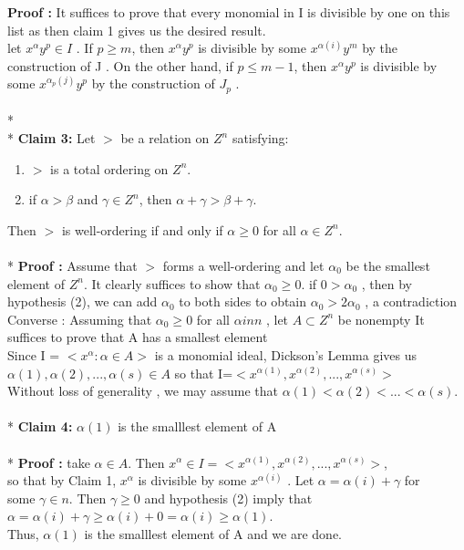 \documentclass[12pt]{article}
\begin{document}
{\bf Proof :}  It suffices to prove that every monomial in I is divisible by one on this list as then claim 1 gives us the desired result.\\
let $x^{\alpha} y^{p} \in I$ . If $p \geq m$, then $x^{\alpha} y^{p}$ is divisible by some $x^{α(i)}y^{m}$ by the construction of J . On the other hand, if $p \leq m - 1$, then $x^{\alpha} y^{p}$ is divisible by some $x^{\alpha_{p}(j)} y^{p}$ by the construction of $J_{p}$ .\\\\*\\*
{\bf Claim 3: } Let $>$ be a relation on $Z^{n}$ satisfying: 
\begin{enumerate}
\item $>$ is a total ordering on $Z^{n}$.
\item if $\alpha > \beta$ and $\gamma \in Z^{n}$, then $\alpha + \gamma > \beta + \gamma$.
\end{enumerate}
Then $>$ is well-ordering if and only if $\alpha \geq 0$ for all $\alpha \in Z^{n}$.\\\\*
{\bf Proof :} Assume that $>$ forms a well-ordering and let $\alpha_{0}$ be the smallest element of $Z^{n}$. It clearly suffices to show that $\alpha_{0} \geq 0$.  if $0 > \alpha_{0}$ , then by hypothesis (2), we can add $\alpha_{0}$ to both sides to obtain $\alpha_{0} > 2\alpha_{0}$ , a contradiction\\ 
Converse : Assuming that $\alpha_{0} \geq 0$ for all $\alpha in n$ , let $A \subset Z^{n}$ be nonempty
It suffices to prove that A has a smallest element \\
Since I = $<x^{\alpha}:\alpha \in A>$ is a monomial ideal, Dickson’s Lemma gives us  $\alpha(1),{\alpha(2)},...,{\alpha(s)} \in A$ so that  I=$<x^{\alpha(1)},x^{\alpha(2)},...,x^{\alpha(s)}>$ \\
Without loss of generality , we may assume that $\alpha(1)<{\alpha(2)}<...<{\alpha(s)}$. \\\\*
{\bf Claim 4:}  $\alpha(1)$ is the smalllest element of A\\\\*
{\bf Proof :}  
take $\alpha \in A$. Then $x^{\alpha} \in I=<x^{\alpha(1)},x^{\alpha(2)},...,x^{\alpha(s)}>$,\\
so that by Claim 1, $x^{\alpha}$ is divisible by some $x^{\alpha(i)}$ . Let $\alpha = \alpha(i) + \gamma$ for \\
some $\gamma \in n$. Then $\gamma \geq 0$ and hypothesis (2) imply that\\
$\alpha = \alpha(i) + \gamma \geq \alpha(i) + 0 = \alpha(i) \geq \alpha(1)$.\\
Thus, $\alpha(1)$ is the smalllest element of A and we are done.\\
\newpage
\end{document}
